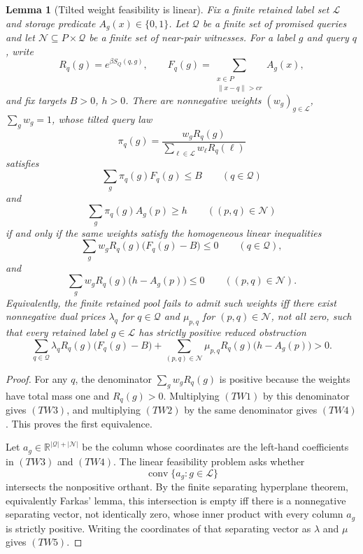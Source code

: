 \documentclass[10pt]{article}
\newtheorem{lemma}[theorem]{Lemma}
\theoremstyle{definition}
\begin{document}
\begin{lemma}[Tilted weight feasibility is linear]
   \label{lem:tilted-weight-linear-feasibility}
   Fix a finite retained label set \(\mathcal L\) and storage predicate
   \(A_g(x)\in\{0,1\}\).  Let \(\mathcal Q\) be a finite set of promised
   queries and let \(\mathcal N\subseteq P\times\mathcal Q\) be a finite set
   of near-pair witnesses.  For a label \(g\) and query \(q\), write
   \[
      R_q(g)=e^{\beta S_Q(q,g)},
      \qquad
      F_q(g)=\sum_{\substack{x\in P\\\|x-q\|>cr}}A_g(x),
   \]
   and fix targets \(B>0\), \(h>0\).  There are nonnegative weights
   \((w_g)_{g\in\mathcal L}\), \(\sum_gw_g=1\), whose tilted query law
   \[
      \pi_q(g)=\frac{w_gR_q(g)}{\sum_{\ell\in\mathcal L}w_\ell R_q(\ell)}
   \]
   satisfies
   \[
      \sum_g\pi_q(g)F_q(g)\le B
      \qquad(q\in\mathcal Q)
      \tag{TW1}
   \]
   and
   \[
      \sum_g\pi_q(g)A_g(p)\ge h
      \qquad((p,q)\in\mathcal N)
      \tag{TW2}
   \]
   if and only if the same weights satisfy the homogeneous linear inequalities
   \[
      \sum_gw_gR_q(g)\bigl(F_q(g)-B\bigr)\le0
      \qquad(q\in\mathcal Q),
      \tag{TW3}
   \]
   and
   \[
      \sum_gw_gR_q(g)\bigl(h-A_g(p)\bigr)\le0
      \qquad((p,q)\in\mathcal N).
      \tag{TW4}
   \]
   Equivalently, the finite retained pool fails to admit such weights iff
   there exist nonnegative dual prices
   \(\lambda_q\) for \(q\in\mathcal Q\) and
   \(\mu_{p,q}\) for \((p,q)\in\mathcal N\), not all zero, such that every
   retained label \(g\in\mathcal L\) has strictly positive reduced obstruction
   \[
      \sum_{q\in\mathcal Q}
      \lambda_qR_q(g)\bigl(F_q(g)-B\bigr)
      +
      \sum_{(p,q)\in\mathcal N}
      \mu_{p,q}R_q(g)\bigl(h-A_g(p)\bigr)
      >0.
      \tag{TW5}
   \]
\end{lemma}

\begin{proof}
   For any \(q\), the denominator
   \(\sum_gw_gR_q(g)\) is positive because the weights have total mass one and
   \(R_q(g)>0\).  Multiplying \((TW1)\) by this denominator gives \((TW3)\),
   and multiplying \((TW2)\) by the same denominator gives \((TW4)\).  This
   proves the first equivalence.

   Let \(a_g\in\mathbb R^{|\mathcal Q|+|\mathcal N|}\) be the column whose
   coordinates are the left-hand coefficients in \((TW3)\) and \((TW4)\).  The
   linear feasibility problem asks whether
   \[
      \operatorname{conv}\{a_g:g\in\mathcal L\}
   \]
   intersects the nonpositive orthant.  By the finite separating hyperplane
   theorem, equivalently Farkas' lemma, this intersection is empty iff there is
   a nonnegative separating vector, not identically zero, whose inner product
   with every column \(a_g\) is strictly positive.  Writing the coordinates of
   that separating vector as \(\lambda\) and \(\mu\) gives \((TW5)\).
\end{proof}
\end{document}
